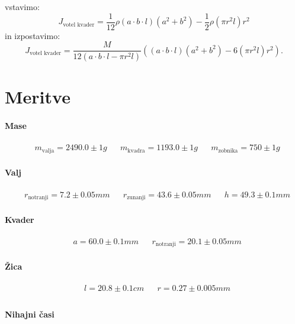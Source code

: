 \documentclass{article}
\begin{document}
vstavimo:
\begin{equation*}
J_\text{votel kvader} = \frac{1}{12} \rho (a \cdot b \cdot l) (a^{2} + b^{2}) - \frac{1}{2} \rho (\pi r^{2} l) r^{2}
\end{equation*}
in izpostavimo:
\begin{equation} \label{eq:5}
J_\text{votel kvader} = \frac{M}{12(a \cdot b \cdot l - \pi r^{2} l)} \left((a \cdot b \cdot l) (a^{2} + b^{2}) - 6(\pi r^{2} l) r^{2} \right).
\end{equation}

\section{Meritve}

\paragraph{Mase}
\begin{align*}
  &m_{\text{valja}}=2490.0 \pm 1 g && m_{\text{kvadra}}=1193.0 \pm 1 g &&m_{\text{zobnika}}=750 \pm 1 g
\end{align*}
\paragraph{Valj}
\begin{align*}
  &r_{\text{notranji}} = 7.2 \pm 0.05 mm && r_{\text{zunanji}} = 43.6 \pm 0.05 mm && h = 49.3 \pm 0.1 mm
\end{align*}
\paragraph{Kvader}
\begin{align*}
  &a = 60.0 \pm 0.1 mm && r_{\text{notranji}} = 20.1 \pm 0.05 mm
\end{align*}

\paragraph{Žica}
\begin{align*}
  &l = 20.8 \pm 0.1 cm && r = 0.27 \pm 0.005 mm \\
\end{align*}

\paragraph{Nihajni časi}
\end{document}
